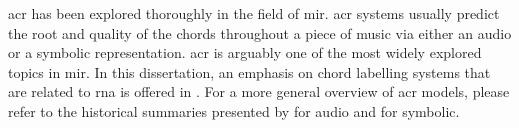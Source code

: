 

\gls{acr} has been explored thoroughly in the field of
\gls{mir}. \gls{acr} systems usually predict the root and
quality of the chords throughout a piece of music via either
an audio or a symbolic representation. \gls{acr} is arguably
one of the most widely explored topics in \gls{mir}. In this
dissertation, an emphasis on chord labelling systems that
are related to \gls{rna} is offered in
. For a more
general overview of \gls{acr} models, please refer to the
historical summaries presented by \textcite{pauwels201920}
for audio and \textcite[p. 58--88]{ju2021addressing} for
symbolic.
